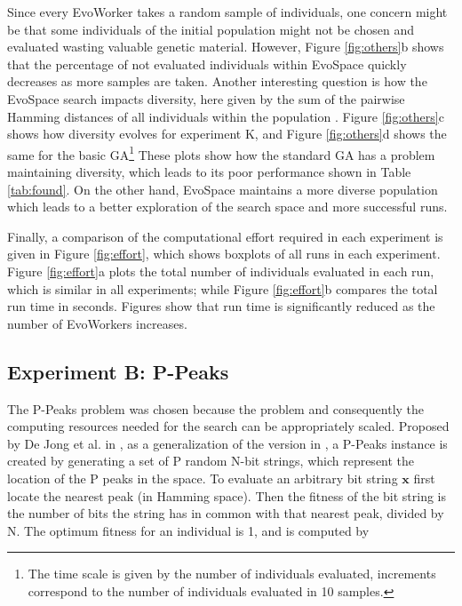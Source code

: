 Since every EvoWorker takes a random sample of individuals, one concern might be that some individuals of the initial population might
not be chosen and evaluated wasting valuable genetic material.
However, Figure \ref{fig:others}b shows that the percentage of not evaluated individuals within EvoSpace quickly decreases as more samples are taken.
Another interesting question is how the EvoSpace search impacts diversity, here given by the sum of the pairwise Hamming distances
of all individuals within the population \cite{diversity}.
Figure \ref{fig:others}c shows how diversity evolves for experiment K, and
Figure \ref{fig:others}d shows the same for the basic GA\footnote{The time scale is given by
the number of individuals evaluated, increments correspond to the number of individuals evaluated in 10 samples.}
These plots show how the standard GA has a problem maintaining diversity, which leads to its poor performance shown in Table \ref{tab:found}.
On the other hand, EvoSpace maintains a more diverse population which leads to a better exploration of the search space and more successful runs.

Finally, a comparison of the computational effort required in each experiment is given in
Figure \ref{fig:effort}, which shows boxplots of all runs in each experiment.
Figure \ref{fig:effort}a plots the total number of individuals evaluated in each run, which is similar in all experiments;
while Figure \ref{fig:effort}b compares the total run time in seconds.
Figures show that run time is significantly reduced as the number of EvoWorkers increases.



\subsection{Experiment B: P-Peaks}
The P-Peaks problem was chosen because the problem and consequently the computing resources needed for the search can be appropriately scaled.
Proposed by De Jong et al. in \cite{Jong:PS97}, as a generalization of the version in \cite{Jong:1990}, a
P-Peaks instance is created by generating a set of P random N-bit
strings, which represent the location of the P peaks in the space. To
evaluate an arbitrary bit string \begin{math} \mathbf{x} \end{math}
first locate the nearest peak (in Hamming space). Then the fitness of
the bit string is the number of bits the string has in common with
that nearest peak, divided by N. The optimum fitness for an individual
is 1, and is computed by

